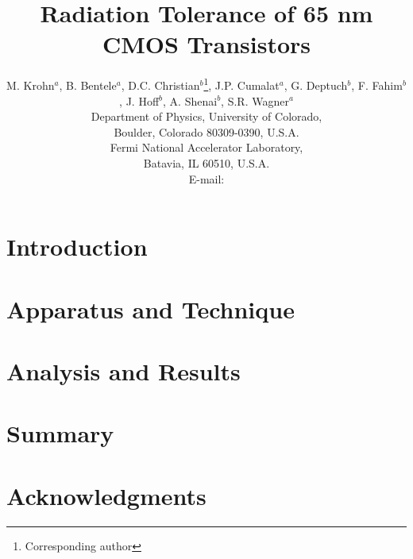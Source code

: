 \documentclass{JINST}
\title{Radiation Tolerance of 65 nm CMOS Transistors}
\author{M. Krohn$^a$, B. Bentele$^a$, D.C. Christian$^b$\thanks{Corresponding author}, J.P. Cumalat$^a$, G. Deptuch$^b$, F. Fahim$^b$, J. Hoff$^b$, A. Shenai$^b$, S.R. Wagner$^a$\\
\llap{$^a$}Department of Physics, University of Colorado,\\
  Boulder, Colorado 80309-0390, U.S.A.\\
\llap{$^b$}Fermi National Accelerator Laboratory,\\
  Batavia, IL 60510, U.S.A.\\
  E-mail: \email{dcc@fnal.gov}}
\begin{document}
\section{Introduction}



\section{Apparatus and Technique}



\section{Analysis and Results}



\section{Summary}



\section{Acknowledgments}



\begin{thebibliography}{00}



\end{thebibliography}
\end{document}
